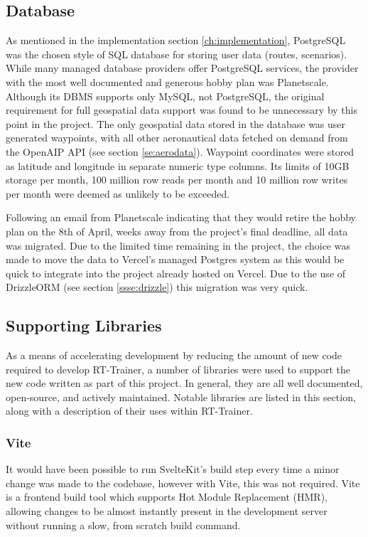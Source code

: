 \subsection{Database}
\label{sse:database}
As mentioned in the implementation section \ref{ch:implementation}, PostgreSQL was the chosen style of SQL database for storing user data (routes, scenarios). While many managed database providers offer PostgreSQL services, the provider with the most well documented and generous hobby plan was Planetscale. Although its DBMS supports only MySQL, not PostgreSQL, the original requirement for full geospatial data support was found to be unnecessary by this point in the project. The only geospatial data stored in the database was user generated waypoints, with all other aeronautical data fetched on demand from the OpenAIP API (see section \ref{se:aerodata}). Waypoint coordinates were stored as latitude and longitude in separate numeric type columns. Its limits of 10GB storage per month, 100 million row reads per month and 10 million row writes per month were deemed as unlikely to be exceeded.

Following an email from Planetscale indicating that they would retire the hobby plan on the 8th of April, weeks away from the project's final deadline, all data was migrated. Due to the limited time remaining in the project, the choice was made to move the data to Vercel's managed Postgres system as this would be quick to integrate into the project already hosted on Vercel. Due to the use of DrizzleORM (see section \ref{ssse:drizzle}) this migration was very quick.

\subsection{Supporting Libraries}
\label{sse:libraries}
As a means of accelerating development by reducing the amount of new code required to develop RT-Trainer, a number of libraries were used to support the new code written as part of this project. In general, they are all well documented, open-source, and actively maintained. Notable libraries are listed in this section, along with a description of their uses within RT-Trainer.

\subsubsection{Vite}
\label{ssse:vite}
It would have been possible to run SvelteKit's build step every time a minor change was made to the codebase, however with Vite, this was not required. Vite is a frontend build tool which supports Hot Module Replacement (HMR), allowing changes to be almost instantly present in the development server without running a slow, from scratch build command.

